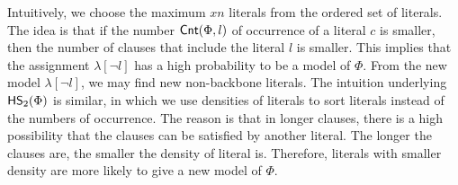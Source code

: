 Intuitively, we choose the maximum $xn$ literals from the ordered set of literals.
The idea is that if the number $\textsf{Cnt}(\Phi,l)$ of occurrence of a literal $c$ is smaller, 
then the number of clauses that include the literal $l$ is smaller. This implies that the assignment $\lambda[\neg l]$ has a high probability to be a model of
$\Phi$. From the new model $\lambda[\neg l]$, we may find new non-backbone literals.
The intuition underlying ${\sf HS}_2(\Phi)$ is similar, in which we use densities of literals to sort literals instead of the numbers of occurrence.
The reason is that in longer clauses, there is a high possibility that the clauses can be satisfied by another literal. The longer the clauses are, the smaller the density of literal is. Therefore, literals with smaller density are more likely to give a new model of $\Phi$.









